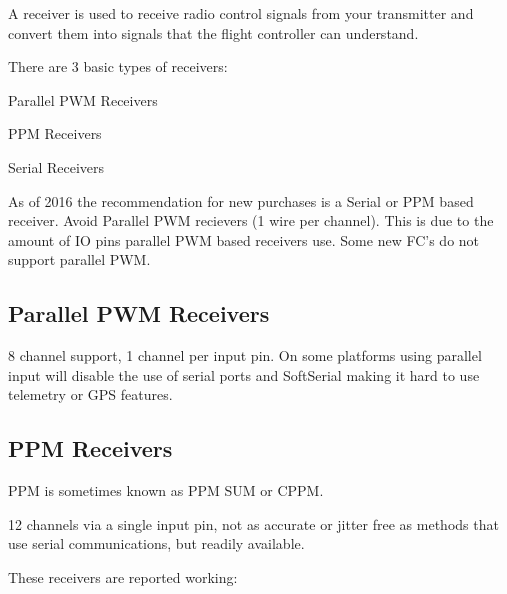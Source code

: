 A receiver is used to receive radio control signals from your transmitter and convert them into signals that the flight controller can understand.

There are 3 basic types of receivers\+:


\begin{DoxyEnumerate}
\item Parallel P\+W\+M Receivers
\item P\+P\+M Receivers
\item Serial Receivers
\end{DoxyEnumerate}

As of 2016 the recommendation for new purchases is a Serial or P\+P\+M based receiver. Avoid Parallel P\+W\+M recievers (1 wire per channel). This is due to the amount of I\+O pins parallel P\+W\+M based receivers use. Some new F\+C's do not support parallel P\+W\+M.

\subsection*{Parallel P\+W\+M Receivers}

8 channel support, 1 channel per input pin. On some platforms using parallel input will disable the use of serial ports and Soft\+Serial making it hard to use telemetry or G\+P\+S features.

\subsection*{P\+P\+M Receivers}

P\+P\+M is sometimes known as P\+P\+M S\+U\+M or C\+P\+P\+M.

12 channels via a single input pin, not as accurate or jitter free as methods that use serial communications, but readily available.

These receivers are reported working\+:


